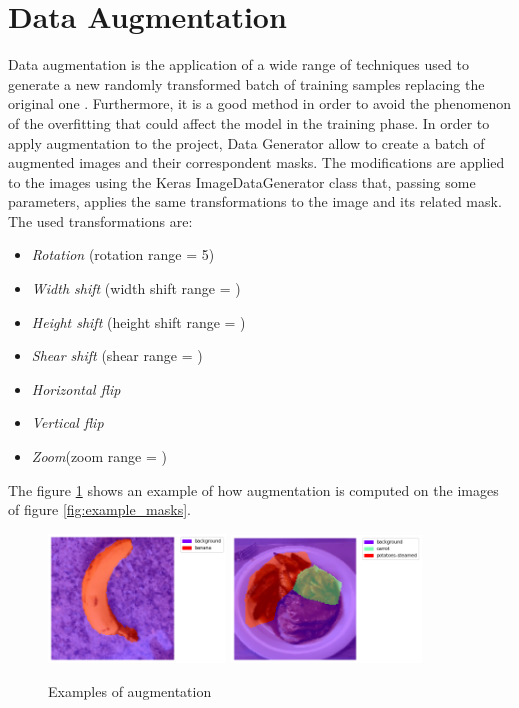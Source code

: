 \documentclass[a4paper,10pt]{report}
\begin{document}
\section{Data Augmentation}\label{sec:section-34}
Data augmentation is the application of a wide range of techniques used to generate a new randomly transformed batch of training samples replacing the original one \cite{augmentation}. Furthermore, it is a good method in order to avoid the phenomenon of the overfitting that could affect the model in the training phase. In order to apply augmentation to the project, Data Generator allow to create a batch of augmented images and their correspondent masks.
The modifications are applied to the images using the Keras ImageDataGenerator class that, passing some parameters, applies the same transformations to the image and its related mask.
The used transformations are:
\begin{itemize}
    \item \emph{Rotation} (rotation range = 5\textdegree)
    \item \emph{Width shift} (width shift range = )
    \item \emph{Height shift} (height shift range = )
    \item \emph{Shear shift} (shear range = )
    \item \emph{Horizontal flip} 
    \item \emph{Vertical flip}
    \item \emph{Zoom}(zoom range = )
\end{itemize}

The figure \ref{fig:example_aug} shows an example of how augmentation is computed on the images of figure \ref{fig:example_masks}.

\begin{figure}[h]
    \centering
    \includegraphics[width=0.42\textwidth]{assets/img/banana_aug.png}
    \includegraphics[width=0.45\textwidth]{assets/img/potatoes_aug.png}
    \caption{Examples of augmentation}
    \label{fig:example_aug}
\end{figure}
\end{document}
